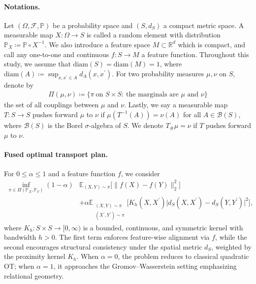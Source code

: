 \documentclass{article}
\begin{document}
\paragraph{Notations.}
Let $(\Omega,\mathcal{F},\mathbb{P})$ be a probability space and $(S,d_S)$ a compact metric space. 
A measurable map $X:\Omega\to S$ is called a random element with distribution $\mathbb{P}_X\coloneqq\mathbb{P}\circ X^{-1}$.
We also introduce a feature space $M\subset\mathbb{R}^d$ which is compact, and call any one-to-one and continuous $f:S\to M$ a feature function. Throughout this study, we assume that $\mathrm{diam}(S) = \mathrm{diam}(M) = 1$, where $\mathrm{diam}(A) \coloneqq \sup_{x,x^\prime \in A}d_A(x,x^\prime)$. For two probability measures $\mu,\nu$ on $S$, denote by
\begin{align*}
	\Pi(\mu,\nu) \coloneqq \{\pi\ \text{on }S\times S:\ \text{the marginals are }\mu\text{ and }\nu\}
\end{align*}
the set of all couplings between $\mu$ and $\nu$. Lastly, we say a measurable map $T: S \to S$ pushes forward $\mu$ to $\nu$ if $\mu(T^{-1}(A)) = \nu(A)$ for all $A \in \mathcal{B}(S)$, where $\mathcal{B}(S)$ is the Borel $\sigma$-algebra of $S$. We denote $T_{\#}\mu = \nu$ if $T$ pushes forward $\mu$ to $\nu$.

\paragraph{Fused optimal transport plan.}
For $0\le \alpha\le 1$ and a feature function $f$, we consider
\begin{align}
	\label{eq:pi-fused-ot}
	\inf_{\pi\in\Pi(\mathbb{P}_X,\mathbb{P}_Y)} 
	(1-\alpha)&\mathbb{E}_{(X,Y)\sim\pi}\big[\|f(X)-f(Y)\|_2^2\big] \nonumber\\
	&+ \alpha\mathbb{E}_{\substack{(X,Y)\sim\pi\\(X^\prime,Y^\prime)\sim\pi}}
	\Big[K_h(X,X^\prime) \big|d_S(X,X^\prime)-d_S(Y,Y^\prime)\big|^2\Big],
\end{align}
where $K_h:S\times S\to[0,\infty)$ is a bounded, continuous, and symmetric kernel with bandwidth $h > 0$. The first term enforces feature-wise alignment via $f$, while the second encourages structural consistency under the spatial metric $d_S$, weighted by the proximity kernel $K_h$. When $\alpha = 0$, the problem reduces to classical quadratic OT; when $\alpha = 1$, it approaches the Gromov–Wasserstein setting emphasizing relational geometry.
\end{document}
